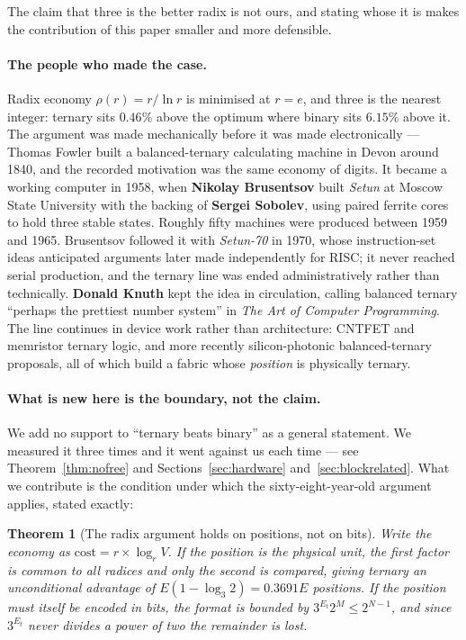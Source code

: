 \documentclass[11pt]{article}
\newtheorem{theorem}{Theorem}
\theoremstyle{definition}
\begin{document}
The claim that three is the better radix is not ours, and stating whose it is
makes the contribution of this paper smaller and more defensible.

\paragraph{The people who made the case.} Radix economy $\rho(r) = r/\ln r$ is
minimised at $r = e$, and three is the nearest integer: ternary sits $0.46\%$
above the optimum where binary sits $6.15\%$ above it. The argument was made
mechanically before it was made electronically --- Thomas Fowler built a
balanced-ternary calculating machine in Devon around 1840, and the recorded
motivation was the same economy of digits. It became a working computer in 1958,
when \textbf{Nikolay Brusentsov} built \emph{Setun} at Moscow State University
with the backing of \textbf{Sergei Sobolev}, using paired ferrite cores to hold
three stable states. Roughly fifty machines were produced between 1959 and 1965.
Brusentsov followed it with \emph{Setun-70} in 1970, whose instruction-set ideas
anticipated arguments later made independently for RISC; it never reached serial
production, and the ternary line was ended administratively rather than
technically. \textbf{Donald Knuth} kept the idea in circulation, calling balanced
ternary ``perhaps the prettiest number system'' in \emph{The Art of Computer
Programming}. The line continues in device work rather than architecture: CNTFET
and memristor ternary logic, and more recently silicon-photonic balanced-ternary
proposals, all of which build a fabric whose \emph{position} is physically
ternary.

\paragraph{What is new here is the boundary, not the claim.} We add no support to
``ternary beats binary'' as a general statement. We measured it three times and it
went against us each time --- see Theorem~\ref{thm:nofree} and
Sections~\ref{sec:hardware} and~\ref{sec:blockrelated}. What we contribute is the
condition under which the sixty-eight-year-old argument applies, stated exactly:

\begin{theorem}[The radix argument holds on positions, not on bits]
\label{thm:boundary}
Write the economy as $\text{cost} = r \times \log_r V$. If the position is the
physical unit, the first factor is common to all radices and only the second is
compared, giving ternary an unconditional advantage of $E(1-\log_3 2) = 0.3691E$
positions. If the position must itself be encoded in bits, the format is bounded
by $3^{E_t} 2^{M} \le 2^{N-1}$, and since $3^{E_t}$ never divides a power of two
the remainder is lost.
\end{theorem}
\end{document}

